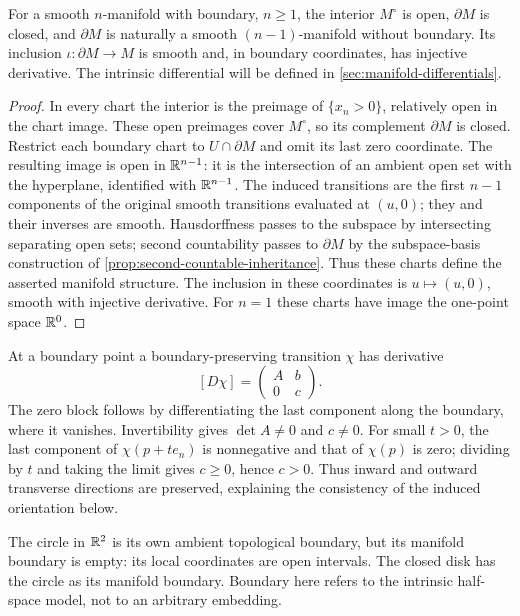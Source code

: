 \begin{proposition}\label{prop:boundary-structure}
For a smooth $n$-manifold with boundary, $n\geq1$, the interior $M^\circ$
is open, $\partial M$ is closed, and $\partial M$ is naturally a smooth
$(n-1)$-manifold without boundary. Its inclusion $\iota:\partial M\to M$
is smooth and, in boundary coordinates, has injective derivative.
The intrinsic differential will be defined in \cref{sec:manifold-differentials}.
\end{proposition}
\begin{proof}
In every chart the interior is the preimage of $\{x_n>0\}$, relatively
open in the chart image. These open preimages cover $M^\circ$, so its
complement $\partial M$ is closed. Restrict each boundary chart to
$U\cap\partial M$ and omit its last zero coordinate. The resulting
image is open in $\mathbb{R}^{n-1}$: it is the intersection of an ambient open
set with the hyperplane, identified with $\mathbb{R}^{n-1}$.
The induced transitions are the first $n-1$ components of the original
smooth transitions evaluated at $(u,0)$; they and their inverses are smooth.
Hausdorffness passes to the subspace by intersecting separating open sets;
second countability passes to $\partial M$ by the subspace-basis
construction of \cref{prop:second-countable-inheritance}.
Thus these charts define the asserted manifold structure. The inclusion
in these coordinates is $u\mapsto(u,0)$, smooth with injective derivative.
For $n=1$ these charts have image the one-point space $\mathbb{R}^0$.
\end{proof}

At a boundary point a boundary-preserving transition $\chi$ has derivative
\[
[D\chi]=\begin{pmatrix}A&b\\0&c\end{pmatrix}.
\]
The zero block follows by differentiating the last component along the
boundary, where it vanishes. Invertibility gives $\det A\ne0$ and $c\ne0$.
For small $t>0$, the last component of $\chi(p+te_n)$ is nonnegative
and that of $\chi(p)$ is zero; dividing by $t$ and taking the limit
gives $c\geq0$, hence $c>0$. Thus inward and outward transverse directions
are preserved, explaining the consistency of the induced orientation below.

\begin{remark}
The circle in $\mathbb{R}^2$ is its own ambient topological boundary, but its
manifold boundary is empty: its local coordinates are open intervals.
The closed disk has the circle as its manifold boundary. Boundary here
refers to the intrinsic half-space model, not to an arbitrary embedding.
\end{remark}

